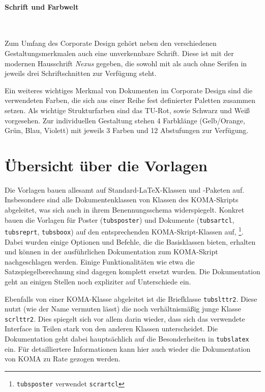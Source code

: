 \paragraph{Schrift und Farbwelt}\hfill\\
\begin{minipage}[t]{0.45\textwidth}
\vspace*{0pt}
\centering{}%
\end{minipage}
\begin{minipage}[t]{0.55\textwidth}
\vspace*{0pt}
Zum Umfang des Corporate Design gehört neben den verschiedenen
Gestaltungsmerkmalen auch eine unverkennbare Schrift.
Diese ist mit der modernen Hausschrift \emph{Nexus} gegeben, die sowohl mit als auch
ohne Serifen in jeweils drei Schriftschnitten zur Verfügung steht.
%

Ein weiteres wichtiges Merkmal von Dokumenten im Corporate Design sind
die verwendeten Farben, die sich aus einer Reihe fest definierter Paletten
zusammen setzen.
%
Als wichtige Strukturfarben sind das TU-Rot, sowie Schwarz und Weiß vorgesehen.
Zur individuellen Gestaltung stehen 4 Farbklänge (Gelb/Orange, Grün, Blau, Violett)
mit jeweils 3 Farben und 12 Abstufungen zur Verfügung.
%
\end{minipage}

\clearpage
\section{Übersicht über die Vorlagen}

Die Vorlagen bauen allesamt auf Standard-\LaTeX-Klassen und -Paketen auf.
Insbesondere sind alle Dokumentenklassen von Klassen des KOMA-Skripts
abgeleitet, was sich auch in ihrem Benennungsschema widerspiegelt.
Konkret bauen die Vorlagen für Poster (\texttt{tubsposter}) und Dokumente
(\texttt{tubsartcl}, \texttt{tubsreprt}, \texttt{tubsboox}) auf
den entsprechenden KOMA-Skript-Klassen auf,%
\footnote{\texttt{tubsposter} verwendet \texttt{scrartcl}}.
Dabei wurden einige Optionen und Befehle, die die Basisklassen bieten, erhalten
und können in der ausführlichen Dokumentation zum KOMA-Skript\cite{koma-skript}
nachgeschlagen werden.
Einige Funktionalitäten wie etwa die Satzspiegelberechnung sind dagegen
komplett ersetzt wurden.
Die Dokumentation geht an einigen Stellen noch expliziter auf Unterschiede ein.

Ebenfalls von einer KOMA-Klasse abgeleitet ist die Briefklasse
\texttt{tubslttr2}.
Diese nutzt (wie der Name vermuten lässt) die noch verhältnismäßig junge
Klasse \texttt{scrlttr2}. Dies spiegelt sich vor allem darin wieder, dass sich
das verwendete Interface in Teilen stark von den anderen Klassen unterscheidet.
Die Dokumentation geht dabei hauptsächlich auf die Besonderheiten in
\texttt{tubslatex} ein.
Für detailliertere Informationen kann hier auch wieder die Dokumentation von
KOMA\cite{koma-skript} zu Rate gezogen werden.

